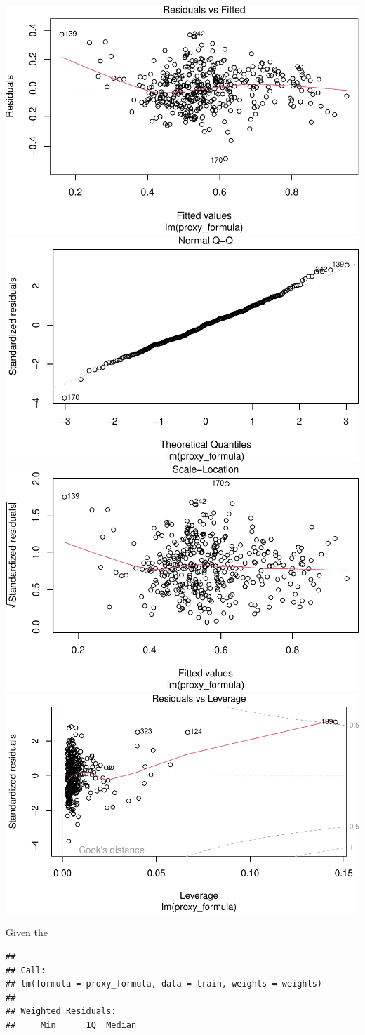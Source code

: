 \documentclass[
  man]{apa6}
\begin{document}
\includegraphics{final-project_files/figure-latex/plot-proxy-model-1.pdf} \includegraphics{final-project_files/figure-latex/plot-proxy-model-2.pdf} \includegraphics{final-project_files/figure-latex/plot-proxy-model-3.pdf} \includegraphics{final-project_files/figure-latex/plot-proxy-model-4.pdf}

Given the

\begin{verbatim}
## 
## Call:
## lm(formula = proxy_formula, data = train, weights = weights)
## 
## Weighted Residuals:
##     Min      1Q  Median 
\end{verbatim}
\end{document}
